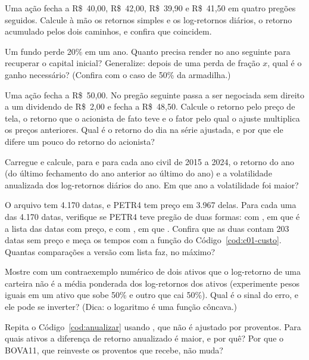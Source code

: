 \begin{exercicios}
  \item {} Uma ação fecha a R\$~40,00, R\$~42,00, R\$~39,90 e R\$~41,50 em quatro pregões seguidos. Calcule à mão os retornos simples e os log-retornos diários, o retorno acumulado pelos dois caminhos, e confira que coincidem.
  \item {} Um fundo perde 20\% em um ano. Quanto precisa render no ano seguinte para recuperar o capital inicial? Generalize: depois de uma perda de fração $x$, qual é o ganho necessário? (Confira com o caso de 50\% da armadilha.)
  \item {} Uma ação fecha a R\$~50,00. No pregão seguinte passa a ser negociada sem direito a um dividendo de R\$~2,00 e fecha a R\$~48,50. Calcule o retorno pelo preço de tela, o retorno que o acionista de fato teve e o fator pelo qual o ajuste multiplica os preços anteriores. Qual é o retorno do dia na série ajustada, e por que ele difere um pouco do retorno do acionista?
  \item {} Carregue  e calcule, para  e para cada ano civil de 2015 a 2024, o retorno do ano (do último fechamento do ano anterior ao último do ano) e a volatilidade anualizada dos log-retornos diários do ano. Em que ano a volatilidade foi maior?
  \item {} O arquivo  tem 4.170 datas, e PETR4 tem preço em 3.967 delas. Para cada uma das 4.170 datas, verifique se PETR4 teve pregão de duas formas: com , em que  é a lista das datas com preço, e com , em que . Confira que as duas contam 203 datas sem preço e meça os tempos com a função  do Código~\ref{cod:c01-custo}. Quantas comparações a versão com lista faz, no máximo?
  \item {} Mostre com um contraexemplo numérico de dois ativos que o log-retorno de uma carteira não é a média ponderada dos log-retornos dos ativos (experimente pesos iguais em um ativo que sobe 50\% e outro que cai 50\%). Qual é o sinal do erro, e ele pode se inverter? (Dica: o logaritmo é uma função côncava.)
  \item {} Repita o Código~\ref{cod:anualizar} usando , que não é ajustado por proventos. Para quais ativos a diferença de retorno anualizado é maior, e por quê? Por que o BOVA11, que reinveste os proventos que recebe, não muda?

\end{exercicios}
